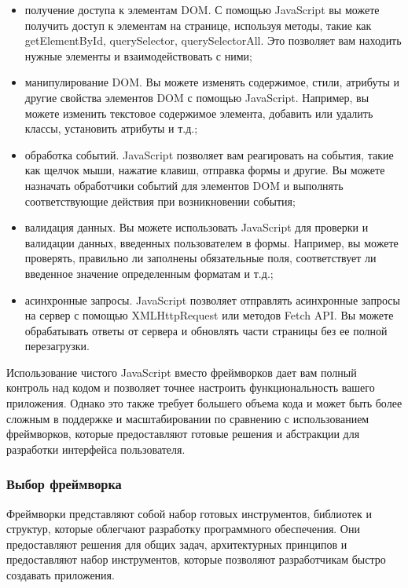 \begin{itemize}
    \item получение доступа к элементам DOM. С помощью JavaScript вы можете получить доступ к элементам на странице, используя методы, такие как getElementById, querySelector, querySelectorAll. Это позволяет вам находить нужные элементы и взаимодействовать с ними;
    \item манипулирование DOM. Вы можете изменять содержимое, стили, атрибуты и другие свойства элементов DOM с помощью JavaScript. Например, вы можете изменить текстовое содержимое элемента, добавить или удалить классы, установить атрибуты и т.д.;
    \item обработка событий. JavaScript позволяет вам реагировать на события, такие как щелчок мыши, нажатие клавиш, отправка формы и другие. Вы можете назначать обработчики событий для элементов DOM и выполнять соответствующие действия при возникновении события;
    \item валидация данных. Вы можете использовать JavaScript для проверки и валидации данных, введенных пользователем в формы. Например, вы можете проверять, правильно ли заполнены обязательные поля, соответствует ли введенное значение определенным форматам и т.д.;
    \item асинхронные запросы. JavaScript позволяет отправлять асинхронные запросы на сервер с помощью XMLHttpRequest или методов Fetch API. Вы можете обрабатывать ответы от сервера и обновлять части страницы без ее полной перезагрузки.    
\end{itemize}

Использование чистого JavaScript вместо фреймворков дает вам полный контроль над кодом и позволяет точнее настроить функциональность вашего приложения. Однако это также требует большего объема кода и может быть более сложным в поддержке и масштабировании по сравнению с использованием фреймворков, которые предоставляют готовые решения и абстракции для разработки интерфейса пользователя.

\subsubsection{Выбор фреймворка}

Фреймворки представляют собой набор готовых инструментов, библиотек и структур, которые облегчают разработку программного обеспечения. Они предоставляют решения для общих задач, архитектурных принципов и предоставляют набор инструментов, которые позволяют разработчикам быстро создавать приложения.

